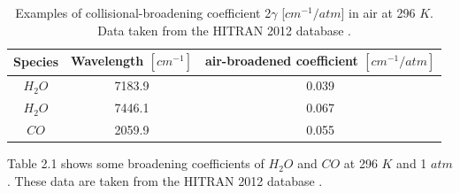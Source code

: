 \begin{table}[h]
\begin{center}
\begin{tabular}{ c c c }
\hline
Species & Wavelength $[cm^{-1}]$ & air-broadened coefficient $[cm^{-1}/atm]$\\ \hline
$H_2O$ & 7183.9 & 0.039\\ 
$H_2O$ & 7446.1 & 0.067\\ 
$CO$ & 2059.9 & 0.055\\ \hline
\end{tabular}
\caption{Examples of collisional-broadening coefficient 2$\gamma$ [$cm^{-1}/atm$] in air at 296 $K$. Data taken from the HITRAN 2012 database \cite{2013JQSRT.130....4R}.}
\label{table:ch2_1}
\end{center}
\end{table}

\vspace{-5mm}

Table 2.1 shows some broadening coefficients of $H_2O$ and $CO$ at 296 $K$ and 1 $atm$. These data are taken from the HITRAN 2012 database \cite{2013JQSRT.130....4R}.




